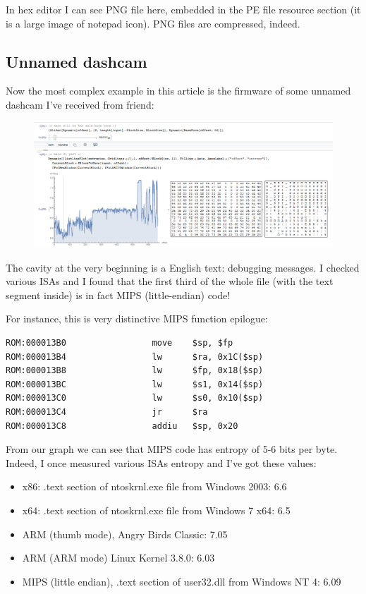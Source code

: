 In hex editor I can see PNG file here, embedded in the PE file resource section (it is a large image of notepad icon).
PNG files are compressed, indeed.

\subsection{Unnamed dashcam}

Now the most complex example in this article is the firmware of some unnamed dashcam I've received from friend:

\begin{figure}[H]
\centering
\includegraphics[scale=\FigScale]{ff/entropy/dashcam_text.png}
\end{figure}

The cavity at the very beginning is a English text: debugging messages.
I checked various ISAs and I found that 
the first third of the whole file (with the text segment inside) is in fact MIPS (little-endian) code!

For instance, this is very distinctive MIPS function epilogue:

\begin{lstlisting}
ROM:000013B0                 move    $sp, $fp
ROM:000013B4                 lw      $ra, 0x1C($sp)
ROM:000013B8                 lw      $fp, 0x18($sp)
ROM:000013BC                 lw      $s1, 0x14($sp)
ROM:000013C0                 lw      $s0, 0x10($sp)
ROM:000013C4                 jr      $ra
ROM:000013C8                 addiu   $sp, 0x20
\end{lstlisting}

From our graph we can see that MIPS code has entropy of 5-6 bits per byte.
Indeed, I once measured various ISAs entropy and I've got these values:

\begin{itemize}
\item x86: .text section of ntoskrnl.exe file from Windows 2003: 6.6
\item x64: .text section of ntoskrnl.exe file from Windows 7 x64: 6.5
\item ARM (thumb mode), Angry Birds Classic: 7.05
\item ARM (ARM mode) Linux Kernel 3.8.0: 6.03
\item MIPS (little endian), .text section of user32.dll from Windows NT 4: 6.09
\end{itemize}

